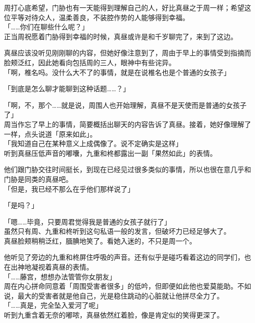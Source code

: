 周打心底希望，门胁也有一天能得到理解自己的人，好比真昼之于周一样；希望这位平等对待众人，温柔善良，不装腔作势的人能够得到幸福。\\

「……你们在聊些什么呢？」\\

正当周祝愿着门胁得到幸福的时候，真昼或许是和千岁聊完了，来到了这边。

真昼应该没听见刚刚聊的内容，但她好像注意到了，周由于早上的事情受到指摘而脸颊泛红，因此她看向包括周的三人，眼神中有些诧异。\\

「啊，椎名吗。没什么大不了的事情，就是在说椎名也是个普通的女孩子」

「到底是怎么聊才能聊到这种话题……？」

「啊，不，那个……就是说，周围人也开始理解，真昼不是天使而是普通的女孩子了」\\

周当作忘了早上的事情，简要概括出聊天的内容告诉了真昼。接着，她好像理解了一样，点头说道「原来如此」。\\

「我知道自己在某种意义上成偶像了。说不定确实是这样」\\

听到真昼压低声音的嘟囔，九重和柊都露出一副「果然如此」的表情。

他们跟门胁交往时间挺长，到现在已经见过很多类似的事情，所以也很在意几乎和门胁是同类的真昼吧。\\

「但是，我已经不那么在乎他们那样说了」

「是吗？」

「嗯……毕竟，只要周君觉得我是普通的女孩子就行了」\\

虽然只有周、九重和柊听到这句私语一般的发言，但破坏力已经足够大了。\\

真昼脸颊稍稍泛红，腼腆地笑了。看她入迷的，不只是周一个。

他听见了旁边的九重和柊屏住呼吸的声音。还有似乎是碰巧看着这边的同学们，也在出神地凝视着真昼的表情。\\

「……藤宫，想想办法管管你女朋友」\\

周在内心拼命同意着「周围受害者很多」的低吟，但即便如此他也爱莫能助。不如说，最大的受害者就是他自己，光是稳住跳动的心脏就让他拼尽全力了。\\

「……真是，完全坠入爱河了呢」\\

听到九重含着无奈的嘟哝，真昼依然红着脸，像是肯定似的笑得更深了。
